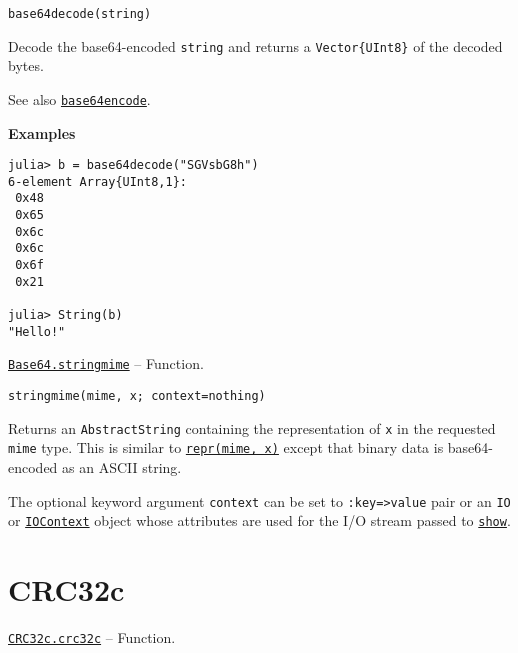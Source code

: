 \begin{adjustwidth}{2em}{0pt}


\begin{verbatim}
base64decode(string)
\end{verbatim}

Decode the base64-encoded \texttt{string} and returns a \texttt{Vector\{UInt8\}} of the decoded bytes.

See also \hyperlink{1446212874874362397}{\texttt{base64encode}}.

\textbf{Examples}


\begin{verbatim}
julia> b = base64decode("SGVsbG8h")
6-element Array{UInt8,1}:
 0x48
 0x65
 0x6c
 0x6c
 0x6f
 0x21

julia> String(b)
"Hello!"
\end{verbatim}



\end{adjustwidth}
\hypertarget{17279723834582920486}{} 
\hyperlink{17279723834582920486}{\texttt{Base64.stringmime}}  -- {Function.}

\begin{adjustwidth}{2em}{0pt}


\begin{verbatim}
stringmime(mime, x; context=nothing)
\end{verbatim}

Returns an \texttt{AbstractString} containing the representation of \texttt{x} in the requested \texttt{mime} type. This is similar to \hyperlink{13076889230390082034}{\texttt{repr(mime, x)}} except that binary data is base64-encoded as an ASCII string.

The optional keyword argument \texttt{context} can be set to \texttt{:key=>value} pair or an \texttt{IO} or \hyperlink{13454403377667762339}{\texttt{IOContext}} object whose attributes are used for the I/O stream passed to \hyperlink{14071376285304310153}{\texttt{show}}.



\end{adjustwidth}

\hypertarget{2465264826987872946}{}


\chapter{CRC32c}


\hypertarget{8058568265327059376}{} 
\hyperlink{8058568265327059376}{\texttt{CRC32c.crc32c}}  -- {Function.}

